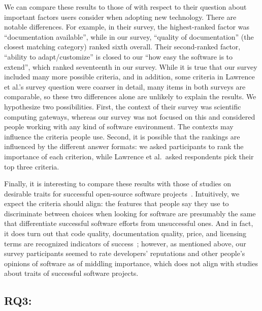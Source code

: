 \documentclass[review]{elsarticle}
\begin{document}
We can compare these results to those of \citet{lawrence2015science} with respect to their question about important factors users consider when adopting new technology.  There are notable differences.  For example, in their survey, the highest-ranked factor was ``documentation available'', while in our survey, ``quality of documentation'' (the closest matching category) ranked sixth overall.  Their second-ranked factor, ``ability to adapt/customize'' is closed to our ``how easy the software is to extend'', which ranked seventeenth in our survey.  While it is true that our survey included many more possible criteria, and in addition, some criteria in Lawrence et al.'s survey question were coarser in detail, many items in both surveys are comparable, so these two differences alone are unlikely to explain the results.  We hypothesize two possibilities.  First, the context of their survey was scientific computing gateways, whereas our survey was not focused on this and considered people working with any kind of software environment.  The contexts may influence the criteria people use.  Second, it is possible that the rankings are influenced by the different answer formats: we asked participants to rank the importance of each criterion, while Lawrence et al.\ asked respondents pick their top three criteria.

Finally, it is interesting to compare these results with those of studies on desirable traits for successful open-source software projects~\citep[e.g.,][]{subramaniam2009determinants, lee2009measuring, crowston2003defining, crowston2006information, sen2012open, lee2009measuring}.  Intuitively, we expect the criteria should align: the features that people say they use to discriminate between choices when looking for software are presumably the same that differentiate successful software efforts from unsuccessful ones.  And in fact, it does turn out that code quality, documentation quality, price, and licensing terms are recognized indicators of success~\citep{subramaniam2009determinants, lee2009measuring, crowston2003defining, crowston2006information}; however, as mentioned above, our survey participants seemed to rate developers' reputations and other people's opinions of software as of middling importance, which does not align with studies about traits of successful software projects.


\subsection{RQ3: \rqthreetext}
\label{discussion-rqthree}
\end{document}
